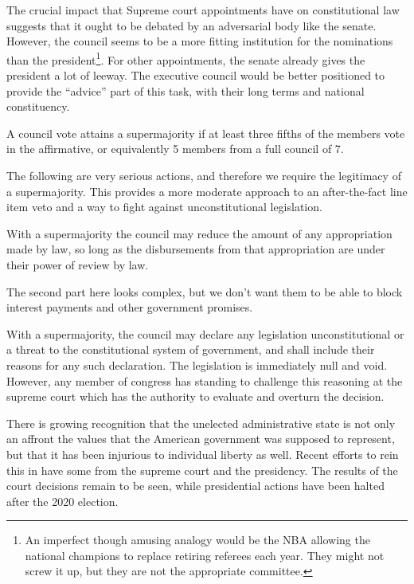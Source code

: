 \documentclass{article}
\begin{document}
The crucial impact that Supreme court appointments have on constitutional law suggests that it ought to be debated by an adversarial body like the senate. However, the council seems to be a more fitting institution for the nominations than the president\footnote{An imperfect though amusing analogy would be the NBA allowing the national champions to replace retiring referees each year. They might not screw it up, but they are not the appropriate committee.}. For other appointments, the senate already gives the president a lot of leeway. The executive council would be better positioned to provide the “advice” part of this task, with their long terms and national constituency.

\begin{quoting}
A council vote attains a supermajority if at least three fifths of the members vote in the affirmative, or equivalently 5 members from a full council of 7.
\end{quoting}

The following are very serious actions, and therefore we require the legitimacy of a supermajority. This provides a more moderate approach to an after-the-fact line item veto and a way to fight against unconstitutional legislation.

\begin{quoting}
With a supermajority the council may reduce the amount of any appropriation made by law, so long as the disbursements from that appropriation are under their power of review by law.
\end{quoting}

The second part here looks complex, but we don’t want them to be able to block interest payments and other government promises.

\begin{quoting}
With a supermajority, the council may declare any legislation unconstitutional or a threat to the constitutional system of government, and shall include their reasons for any such declaration. The legislation is immediately null and void. However, any member of congress has standing to challenge this reasoning at the supreme court which has the authority to evaluate and overturn the decision.
\end{quoting}

There is growing recognition that the unelected administrative state is not only an affront the values that the American government was supposed to represent, but that it has been injurious to individual liberty as well. Recent efforts to rein this in have some from the supreme court\cite{Crowell} and the presidency\cite{ScheduleF}. The results of the court decisions remain to be seen, while presidential actions have been halted after the 2020 election.
\end{document}
